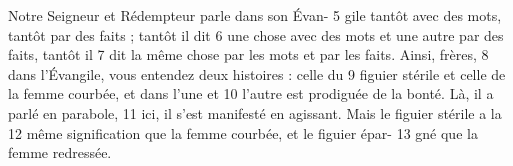 Notre Seigneur et Rédempteur parle dans son Évan-	 
5	 	gile tantôt avec des mots, tantôt par des faits ; tantôt il dit	 
6	 	une chose avec des mots et une autre par des faits, tantôt il	 
7	 	dit la même chose par les mots et par les faits. Ainsi, frères,	 
8	 	dans l'Évangile, vous entendez deux histoires : celle du	 
9	 	figuier stérile et celle de la femme courbée, et dans l'une et	 
10	 	l'autre est prodiguée de la bonté. Là, il a parlé en parabole,	 
11	 	ici, il s'est manifesté en agissant. Mais le figuier stérile a la	 
12	 	même signification que la femme courbée, et le figuier épar-	 
13	 	gné que la femme redressée.